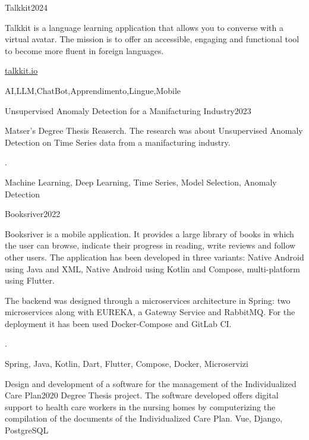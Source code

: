 
\begin{projects}
\project
{Talkkit}{2024}
	{Talkkit is a language learning application that allows you to converse with a virtual avatar. The mission is to offer an accessible, engaging and functional tool to become more fluent in foreign languages.
		 
		\href{https://talkkit.io/}{talkkit.io} }
	{AI,LLM,ChatBot,Apprendimento,Lingue,Mobile}
    
	\project
	{Unsupervised Anomaly Detection for a Manifacturing Industry}{2023}
	{Matser's Degree Thesis Reaserch. The research was about Unsupervised Anomaly Detection on Time Series data from a manifacturing industry.
		 
		. }
	{Machine Learning, Deep Learning, Time Series, Model Selection, Anomaly Detection}
	
	\project
	{Booksriver}{2022}
	{Booksriver is a mobile application. It provides a large library of books in which the user can browse, indicate their progress in reading, write reviews and follow other users. The application has been developed in three variants: Native Android using Java and XML, Native Android using Kotlin and Compose, multi-platform using Flutter.
		 
		The backend was designed through a microservices architecture in Spring: two microservices along with EUREKA, a Gateway Service and RabbitMQ. For the deployment it has been used Docker-Compose and GitLab CI. 
		 
		. }
	{Spring, Java, Kotlin, Dart, Flutter, Compose, Docker, Microservizi}
	
	 
	\project
	{Design and development of a software for the management of the Individualized Care Plan}{2020}
	{Degree Thesis project. The software developed offers digital support to health care workers in the nursing homes by computerizing the compilation of the documents of the Individualized Care Plan.}
	{Vue, Django, PostgreSQL}
					
		
	
	
	
	 
	
\end{projects}